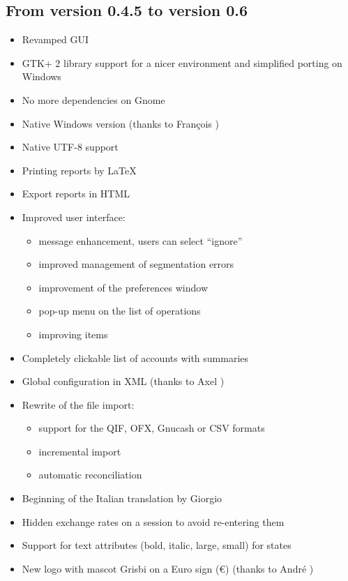 \subsection{From version 0.4.5 to version 0.6}

\begin{itemize}
	\item Revamped GUI
	\item \gls{GTK}+ 2 library support for a nicer environment and simplified porting on Windows
	\item No more dependencies on \gls{Gnome}
	\item Native Windows version (thanks to François )
	\item Native \gls{UTF-8} support 
	\item Printing reports by \gls{LaTeX}
	\item Export reports in \gls{HTML}
	\item Improved user interface:
		\begin{itemize}
		\item message enhancement, users can select ``ignore''
		\item improved management of segmentation errors
		\item improvement of the preferences window
		\item pop-up menu on the list of operations
		\item improving items
		\end{itemize}
	\item Completely clickable list of accounts with summaries
	\item Global configuration in \gls{XML} (thanks to Axel )
	\item Rewrite of the file import:
		\begin{itemize}
		\item support for the \gls{QIF}, \gls{OFX}, \gls{Gnucash} or \gls{CSV}  formats
		\item incremental import
		\item automatic reconciliation
		\end{itemize}
	\item Beginning of the Italian translation by Giorgio 
	\item Hidden exchange rates on a session to avoid re-entering them
	\item Support for text attributes (bold, italic, large, small) for states
	\item New logo with mascot Grisbi on a Euro sign (€) (thanks to André )

\end{itemize}
